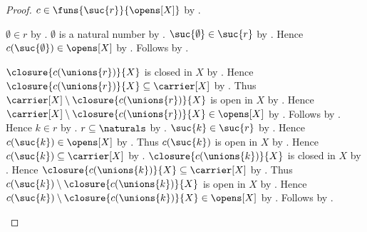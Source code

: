 \begin{proof}
    $c\in\funs{\suc{r}}{\opens[X]}$
        by .
    \begin{byCase}
            $\emptyset\in r$ by .
            $\emptyset$ is a natural number by .
            $\suc{\emptyset}\in\suc{r}$
                by .
            Hence $c(\suc{\emptyset})\in\opens[X]$
                by .
            Follows by .
            \begin{byCase}
                    $\closure{c(\unions{r})}{X}$ is closed in $X$
                        by .
                    Hence $\closure{c(\unions{r})}{X}
                        \subseteq\carrier[X]$
                        by .
                    Thus $\carrier[X]\setminus
                        \closure{c(\unions{r})}{X}$ is open in $X$
                        by .
                    Hence $\carrier[X]\setminus
                        \closure{c(\unions{r})}{X}\in\opens[X]$
                        by .
                    Follows by .
                    Hence $k\in r$ by .
                    $r\subseteq\naturals$
                        by
                        .
                    $\suc{k}\in\suc{r}$
                        by .
                    Hence $c(\suc{k})\in\opens[X]$
                        by .
                    Thus $c(\suc{k})$ is open in $X$ by .
                    Hence $c(\suc{k})\subseteq\carrier[X]$
                        by .
                    $\closure{c(\unions{k})}{X}$ is closed in $X$
                        by .
                    Hence $\closure{c(\unions{k})}{X}
                        \subseteq\carrier[X]$
                        by .
                    Thus $c(\suc{k})\setminus
                        \closure{c(\unions{k})}{X}$ is open in $X$
                        by .
                    Hence $c(\suc{k})\setminus
                        \closure{c(\unions{k})}{X}\in\opens[X]$
                        by .
                    Follows by
                        .
            \end{byCase}
    \end{byCase}
\end{proof}

